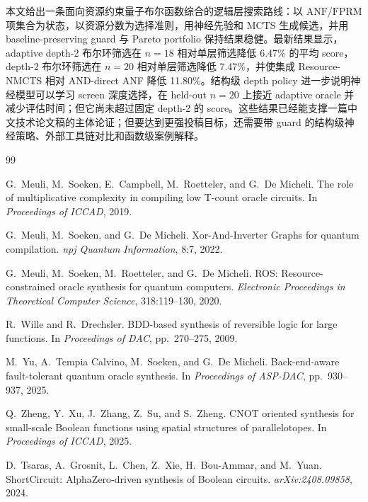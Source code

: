 \documentclass[UTF8,fontset=macnew,11pt]{ctexart}
\newcommand{\method}{Resource-NMCTS}
\newcommand{\anf}{\ensuremath{\mathrm{ANF}}}
\newcommand{\fprm}{\ensuremath{\mathrm{FPRM}}}
\newcommand{\mcts}{\ensuremath{\mathrm{MCTS}}}
\begin{document}
本文给出一条面向资源约束量子布尔函数综合的逻辑层搜索路线：以 \anf{}/\fprm{} 项集合为状态，以资源分数为选择准则，用神经先验和 \mcts{} 生成候选，并用 baseline-preserving guard 与 Pareto portfolio 保持结果稳健。最新结果显示，adaptive depth-2 布尔环筛选在 $n=18$ 相对单层筛选降低 6.47\% 的平均 score，depth-2 布尔环筛选在 $n=20$ 相对单层筛选降低 7.47\%，并使集成 \method{} 相对 AND-direct ANF 降低 11.80\%。结构级 depth policy 进一步说明神经模型可以学习 screen 深度选择，在 held-out $n=20$ 上接近 adaptive oracle 并减少评估时间；但它尚未超过固定 depth-2 的 score。这些结果已经能支撑一篇中文技术论文稿的主体论证；但要达到更强投稿目标，还需要带 guard 的结构级神经策略、外部工具链对比和函数级案例解释。

\begin{thebibliography}{99}

G.~Meuli, M.~Soeken, E.~Campbell, M.~Roetteler, and G.~De Micheli.
\newblock The role of multiplicative complexity in compiling low T-count oracle circuits.
\newblock In \emph{Proceedings of ICCAD}, 2019.

G.~Meuli, M.~Soeken, and G.~De Micheli.
\newblock Xor-And-Inverter Graphs for quantum compilation.
\newblock \emph{npj Quantum Information}, 8:7, 2022.

G.~Meuli, M.~Soeken, M.~Roetteler, and G.~De Micheli.
\newblock ROS: Resource-constrained oracle synthesis for quantum computers.
\newblock \emph{Electronic Proceedings in Theoretical Computer Science}, 318:119--130, 2020.

R.~Wille and R.~Drechsler.
\newblock BDD-based synthesis of reversible logic for large functions.
\newblock In \emph{Proceedings of DAC}, pp.~270--275, 2009.

M.~Yu, A.~Tempia Calvino, M.~Soeken, and G.~De Micheli.
\newblock Back-end-aware fault-tolerant quantum oracle synthesis.
\newblock In \emph{Proceedings of ASP-DAC}, pp.~930--937, 2025.

Q.~Zheng, Y.~Xu, J.~Zhang, Z.~Su, and S.~Zheng.
\newblock CNOT oriented synthesis for small-scale Boolean functions using spatial structures of parallelotopes.
\newblock In \emph{Proceedings of ICCAD}, 2025.

D.~Tsaras, A.~Grosnit, L.~Chen, Z.~Xie, H.~Bou-Ammar, and M.~Yuan.
\newblock ShortCircuit: AlphaZero-driven synthesis of Boolean circuits.
\newblock \emph{arXiv:2408.09858}, 2024.


\end{thebibliography}
\end{document}

